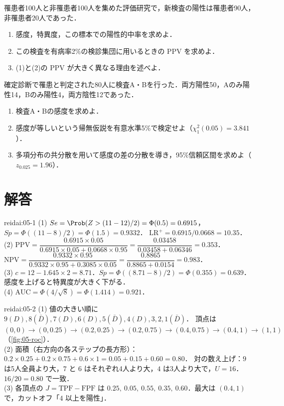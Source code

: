 \begin{reidai}\label{reidai:05-3}
罹患者100人と非罹患者100人を集めた評価研究で，新検査の陽性は罹患者90人，非罹患者20人であった．
\begin{enumerate}[label=(\arabic*)]
\item 感度，特異度，この標本での陽性的中率を求めよ．
\item この検査を有病率2\%の検診集団に用いるときの PPV を求めよ．
\item (1)と(2)の PPV が大きく異なる理由を述べよ．
\end{enumerate}
\end{reidai}

\begin{reidai}[対応のある感度の比較]\label{reidai:05-4}
確定診断で罹患と判定された80人に検査A・Bを行った．両方陽性50，Aのみ陽性14，Bのみ陽性4，両方陰性12であった．
\begin{enumerate}[label=(\arabic*)]
\item 検査A・Bの感度を求めよ．
\item 感度が等しいという帰無仮説を有意水準5\%で検定せよ（$\chi^2_1(0.05)=3.841$）．
\item 多項分布の共分散を用いて感度の差の分散を導き，95\%信頼区間を求めよ（$z_{0.025}=1.96$）．
\end{enumerate}
\end{reidai}

\section{解答}\label{sec:05-sol}
\begin{kaitou}{reidai:05-1}
(1) $Se=\Prob(Z>(11-12)/2)=\Phi(0.5)=0.6915$，$Sp=\Phi((11-8)/2)=\Phi(1.5)=0.9332$．
$\mathrm{LR}^+=0.6915/0.0668=10.35$．\\
(2) $\mathrm{PPV}=\dfrac{0.6915\times0.05}{0.6915\times0.05+0.0668\times0.95}=\dfrac{0.03458}{0.03458+0.06346}=0.353$．
$\mathrm{NPV}=\dfrac{0.9332\times0.95}{0.9332\times0.95+0.3085\times0.05}=\dfrac{0.8865}{0.8865+0.0154}=0.983$．\\
(3) $c=12-1.645\times2=8.71$．$Sp=\Phi((8.71-8)/2)=\Phi(0.355)=0.639$．感度を上げると特異度が大きく下がる．\\
(4) $\mathrm{AUC}=\Phi(4/\sqrt{8})=\Phi(1.414)=0.921$．
\end{kaitou}

\begin{kaitou}{reidai:05-2}
(1) 値の大きい順に $9(D),8(\bar D),7(D),6(D),5(\bar D),4(D),3,2,1(\bar D)$．
頂点は $(0,0)\to(0,0.25)\to(0.2,0.25)\to(0.2,0.75)\to(0.4,0.75)\to(0.4,1)\to(1,1)$（\cref{fig:05-roc}）．\\
(2) 面積（右方向の各ステップの長方形）：$0.2\times0.25+0.2\times0.75+0.6\times1=0.05+0.15+0.60=0.80$．
対の数え上げ：$9$ は5人全員より大，$7$ と $6$ はそれぞれ4人より大，$4$ は3人より大で，$U=16$．$16/20=0.80$ で一致．\\
(3) 各頂点の $J=\mathrm{TPF}-\mathrm{FPF}$ は $0.25,\ 0.05,\ 0.55,\ 0.35,\ 0.60$．最大は $(0.4,1)$ で，カットオフ「$4$ 以上を陽性」．
\end{kaitou}

